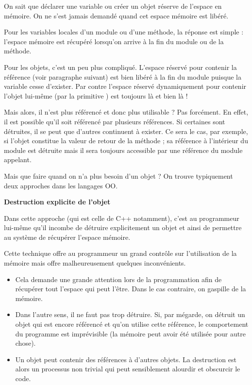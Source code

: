 On sait que déclarer une variable ou créer un objet réserve de l’espace
en mémoire. On ne s’est jamais demandé quand cet espace mémoire est
libéré.

Pour les variables locales d’un module ou d'une
méthode, la réponse est simple : l’espace mémoire est récupéré
lorsqu’on arrive à la fin du module ou de la méthode.

Pour les objets, c’est un peu plus compliqué. L’espace réservé pour
contenir la référence (voir paragraphe suivant) est bien libéré à la
fin du module puisque la variable cesse d’exister. Par contre l’espace
réservé dynamiquement pour contenir l’objet lui-même (par la primitive
) est toujours là et bien là !

Mais alors, il n’est plus référencé et donc plus utilisable ? Pas
forcément. En effet, il est possible qu’il soit référencé par plusieurs
références. Si certaines sont détruites, il se peut que d’autres
continuent à exister. Ce sera le cas, par exemple, si l’objet constitue
la valeur de retour de la méthode ; sa référence à l’intérieur du
module est détruite mais il sera toujours accessible par une référence
du module appelant.

Mais que faire quand on n’a plus besoin d’un objet ? On trouve
typiquement deux approches dans les langages OO.

{\sffamily\bfseries\upshape
Destruction explicite de l’objet}

Dans cette approche (qui est celle de C++ notamment), c’est au
programmeur lui-même qu’il incombe de détruire explicitement un objet
et ainsi de permettre au système de récupérer l’espace mémoire. 

Cette technique offre au programmeur un grand contrôle sur l’utilisation
de la mémoire mais offre malheureusement quelques inconvénients.

\liststyleListv
\begin{itemize}
	\item 
		Cela demande une grande attention lors de la programmation afin de
		récupérer tout l’espace qui peut l’être. Dans le cas contraire, on
		gaspille de la mémoire.
	\item 
		Dans l’autre sens, il ne faut pas trop détruire. Si, par mégarde, on
		détruit un objet qui est encore référencé et qu'on
		utilise cette référence, le comportement du programme est imprévisible
		(la mémoire peut avoir été utilisée pour autre chose).
	\item 
		Un objet peut contenir des références à d’autres objets. La destruction
		est alors un processus non trivial qui peut sensiblement alourdir et
		obscurcir le code.
\end{itemize}

